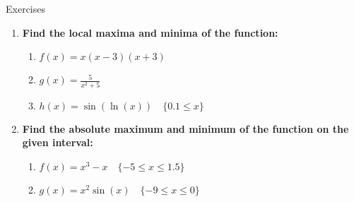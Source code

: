 \documentclass[../revisedmain.tex]{subfiles}
\begin{document}
\begin{center}
	{\Large Exercises}
\end{center}
\begin{enumerate}
	\item \textbf{Find the local maxima and minima of the function:}
	\begin{enumerate}
		\item $f(x)=x(x-3)(x+3)$
		\item $g(x)=\displaystyle\frac{5}{x^2+5}$
		\item $h(x)=\sin(\ln(x))\quad\{0.1\le x\}$
	\end{enumerate}
	\item \textbf{Find the absolute maximum and minimum of the function on the given interval:}
	\begin{enumerate}
		\item $f(x)=x^3-x\quad\{-5\le x\le 1.5 \}$
		\item $g(x)=x^2\sin(x)\quad\{-9\le x\le 0 \}$
	\end{enumerate}
\end{enumerate}
\end{document}
